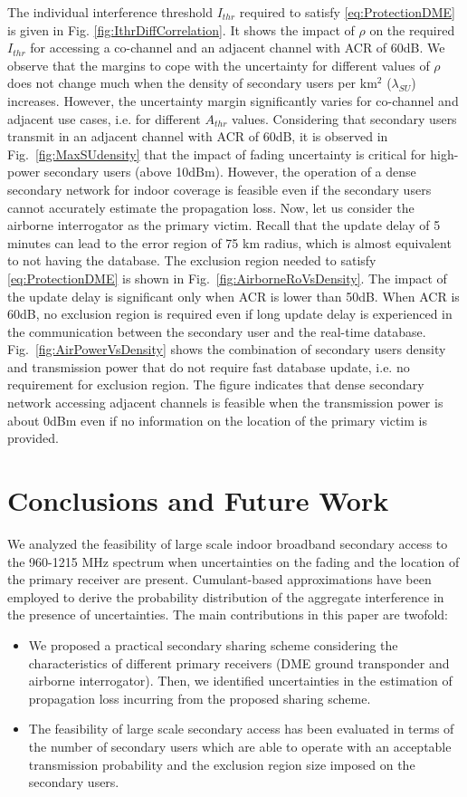 \documentclass[12pt,submission,journal,onecolumn]{IEEEtran}
\begin{document}
The individual interference threshold $I_{thr}$ required to satisfy \eqref{eq:ProtectionDME} is given in Fig. \ref{fig:IthrDiffCorrelation}. It shows the impact of $\rho$ on the required $I_{thr}$ for accessing a co-channel and an adjacent channel with ACR of 60dB. We observe that the margins to cope with the uncertainty for different values of $\rho$ does not change much when the density of secondary users per km$^2$ ($\lambda_{SU}$) increases. However, the uncertainty margin significantly varies for co-channel and adjacent use cases, i.e. for different $A_{thr}$ values. Considering that secondary users transmit in an adjacent channel with ACR of 60dB, it is observed in Fig.~\ref{fig:MaxSUdensity} that the impact of fading uncertainty is critical for high-power secondary users (above 10dBm). However, the operation of a dense secondary network for indoor coverage is feasible even if the secondary users cannot accurately estimate the propagation loss. 
Now, let us consider the airborne interrogator as the primary victim. Recall that the update delay of 5 minutes can lead to the error region of 75 km radius, which is almost equivalent to not having the database. The exclusion region needed to satisfy \eqref{eq:ProtectionDME} is shown in Fig.~\ref{fig:AirborneRoVsDensity}. The impact of the update delay is significant only when ACR is lower than 50dB. When ACR is 60dB, no exclusion region is required even if long update delay is experienced in the communication between the secondary user and the real-time database. Fig.~\ref{fig:AirPowerVsDensity} shows the combination of secondary users density and transmission power that do not require fast database update, i.e. no requirement for exclusion region. The figure indicates that dense secondary network accessing adjacent channels is feasible when the transmission power is about 0dBm even if no information on the location of the primary victim is provided.

\section{Conclusions and Future Work}
\label{sec:Conclusions}
We analyzed the feasibility of large scale indoor broadband secondary access to the 960-1215 MHz spectrum when uncertainties on the fading and the location of the primary receiver are present. Cumulant-based approximations have been employed to derive the probability distribution of the aggregate interference in the presence of uncertainties. The main contributions in this paper are twofold:
\begin{itemize}
\item We proposed a practical secondary sharing scheme considering the characteristics of different primary receivers (DME ground transponder and airborne interrogator). Then, we identified uncertainties in the estimation of propagation loss incurring from the proposed sharing scheme.
\item The feasibility of large scale secondary access has been evaluated in terms of the number of secondary users which are able to operate with an acceptable transmission probability and the exclusion region size imposed on the secondary users.
\end{itemize}
\end{document}
